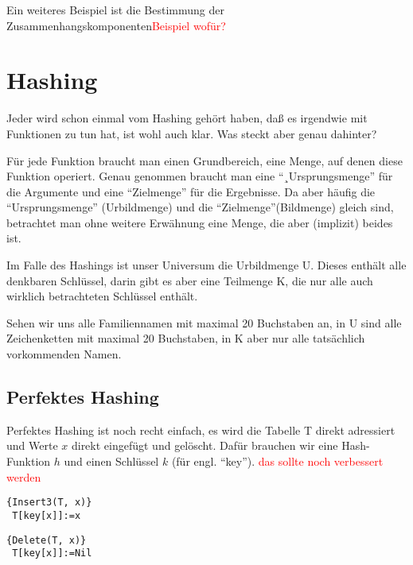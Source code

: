 \documentclass[ngerman,draft,parskip=half*,twoside]{scrreprt}
\theoremstyle{break}
\begin{document}
Ein weiteres Beispiel ist die Bestimmung der Zusammenhangskomponenten\textcolor{red}{Beispiel wofür?}

\chapter{Hashing}
Jeder wird schon einmal vom Hashing gehört haben, daß es irgendwie mit Funktionen zu tun hat, ist wohl auch klar. Was
steckt aber genau dahinter?

Für jede Funktion braucht man einen Grundbereich, eine Menge, auf denen diese Funktion operiert. Genau genommen
braucht man eine "`¸Ursprungsmenge"' für die Argumente und eine "`Zielmenge"' für die Ergebnisse. Da aber häufig die
"`Ursprungsmenge"' (Urbildmenge) und die "`Zielmenge"'(Bildmenge) gleich sind, betrachtet man ohne weitere Erwähnung
eine Menge, die aber (implizit) beides ist.

Im Falle des Hashings ist unser Universum die Urbildmenge U. Dieses enthält alle denkbaren Schlüssel, darin gibt es
aber eine Teilmenge K, die nur alle auch wirklich betrachteten Schlüssel enthält.

Sehen wir uns alle Familiennamen mit maximal 20 Buchstaben an, in U sind alle Zeichenketten mit maximal 20 Buchstaben,
in K aber nur alle tatsächlich vorkommenden Namen.

\section{Perfektes Hashing}
Perfektes Hashing ist noch recht einfach, es wird die Tabelle T direkt adressiert und Werte $x$ direkt eingefügt und
gelöscht. Dafür brauchen wir eine Hash-Funktion $h$ und einen Schlüssel $k$ (für engl. "`key"').
\textcolor{red}{das sollte noch verbessert werden}

\begin{Algorithmus}[H]
\begin{lstlisting}[frame=tlrb, mathescape=true, title=\textsc{Insert\textnormal{(T, x)}},gobble=1]{Insert3(T, x)}
 T[key[x]]:=x
\end{lstlisting}
\end{Algorithmus} 

\begin{Algorithmus}[H]
\begin{lstlisting}[frame=tlrb, mathescape=true, title=\textsc{Delete\textnormal{(T, x)}},gobble=1]{Delete(T, x)}
 T[key[x]]:=Nil
\end{lstlisting}
\end{Algorithmus}
\end{document}

